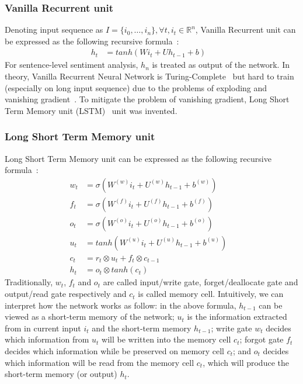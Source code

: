 \subsubsection{Vanilla Recurrent unit}\label{sec:vanilla-rnn}
Denoting input sequence as \(I = \{i_0,\ldots,i_n\}, \forall t, i_t \in \mathbb{R}^n\), Vanilla Recurrent unit can be expressed as the following recursive formula~\cite{treeLSTM}:
\begin{align}
h_t &= tanh(Wi_t + Uh_{t-1} + b)&
\end{align}
For sentence-level sentiment analysis, \(h_n\) is treated as output of the network.
In theory, Vanilla Recurrent Neural Network is Turing-Complete~\cite{rnn-turing-complete} but hard to train (especially on long input sequence) due to the problems of exploding and vanishing gradient~\cite{Bengio1994}.
To mitigate the problem of vanishing gradient, Long Short Term Memory unit (LSTM)~\cite{originLSTM} unit was invented.
\subsubsection{Long Short Term Memory unit}\label{sec:lstm}
Long Short Term Memory unit can be expressed as the following recursive formula~\cite{treeLSTM}:
\begin{align}
w_t &= \sigma(W^{(w)}i_t + U^{(w)}h_{t-1} + b^{(w)}) \label{eq:lstm-input-gate}&\\
f_t &= \sigma(W^{(f)}i_t + U^{(f)}h_{t-1} + b^{(f)}) \label{eq:lstm-forget-gate}&\\
o_t &= \sigma(W^{(o)}i_t + U^{(o)}h_{t-1} + b^{(o)}) \label{eq:lstm-output-gate}&\\
u_t &= tanh(W^{(u)}i_t + U^{(u)}h_{t-1} + b^{(u)}) \label{eq:lstm-update-gate}&\\
c_t &= r_t \otimes u_t + f_t \otimes c_{t-1} \label{eq:longterm-mem}&\\
h_t &= o_t \otimes tanh(c_t) \label{eq:temperal-mem}&
\end{align}
Traditionally, \(w_t\), \(f_t\) and \(o_t\) are called input/write gate, forget/deallocate gate and output/read gate respectively and \(c_t\) is called memory cell.
Intuitively, we can interpret how the network works as follow: 
in the above formula, \(h_{t-1}\) can be viewed as a short-term memory of the network; 
\(u_t\) is the information extracted from in current input \(i_t\) and the short-term memory \(h_{t-1}\); 
write gate \(w_t\) decides which information from \(u_t\) will be written into the memory cell \(c_t\); 
forgot gate \(f_t\) decides which information while be preserved on memory cell \(c_t\); 
and \(o_t\) decides which information will be read from the memory cell \(c_t\), which will produce the short-term memory (or output) \(h_t\).
